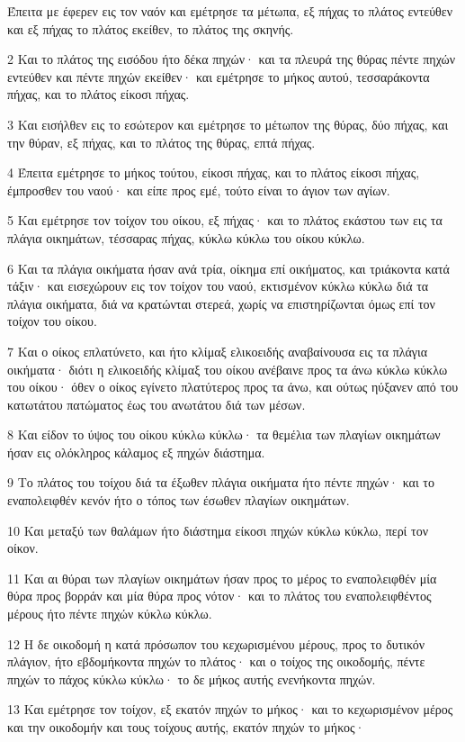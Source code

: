 \par Έπειτα με έφερεν εις τον ναόν και εμέτρησε τα μέτωπα, εξ πήχας το πλάτος εντεύθεν και εξ πήχας το πλάτος εκείθεν, το πλάτος της σκηνής.
\par 2 Και το πλάτος της εισόδου ήτο δέκα πηχών· και τα πλευρά της θύρας πέντε πηχών εντεύθεν και πέντε πηχών εκείθεν· και εμέτρησε το μήκος αυτού, τεσσαράκοντα πήχας, και το πλάτος είκοσι πήχας.
\par 3 Και εισήλθεν εις το εσώτερον και εμέτρησε το μέτωπον της θύρας, δύο πήχας, και την θύραν, εξ πήχας, και το πλάτος της θύρας, επτά πήχας.
\par 4 Έπειτα εμέτρησε το μήκος τούτου, είκοσι πήχας, και το πλάτος είκοσι πήχας, έμπροσθεν του ναού· και είπε προς εμέ, τούτο είναι το άγιον των αγίων.
\par 5 Και εμέτρησε τον τοίχον του οίκου, εξ πήχας· και το πλάτος εκάστου των εις τα πλάγια οικημάτων, τέσσαρας πήχας, κύκλω κύκλω του οίκου κύκλω.
\par 6 Και τα πλάγια οικήματα ήσαν ανά τρία, οίκημα επί οικήματος, και τριάκοντα κατά τάξιν· και εισεχώρουν εις τον τοίχον του ναού, εκτισμένον κύκλω κύκλω διά τα πλάγια οικήματα, διά να κρατώνται στερεά, χωρίς να επιστηρίζωνται όμως επί τον τοίχον του οίκου.
\par 7 Και ο οίκος επλατύνετο, και ήτο κλίμαξ ελικοειδής αναβαίνουσα εις τα πλάγια οικήματα· διότι η ελικοειδής κλίμαξ του οίκου ανέβαινε προς τα άνω κύκλω κύκλω του οίκου· όθεν ο οίκος εγίνετο πλατύτερος προς τα άνω, και ούτως ηύξανεν από του κατωτάτου πατώματος έως του ανωτάτου διά των μέσων.
\par 8 Και είδον το ύψος του οίκου κύκλω κύκλω· τα θεμέλια των πλαγίων οικημάτων ήσαν εις ολόκληρος κάλαμος εξ πηχών διάστημα.
\par 9 Το πλάτος του τοίχου διά τα έξωθεν πλάγια οικήματα ήτο πέντε πηχών· και το εναπολειφθέν κενόν ήτο ο τόπος των έσωθεν πλαγίων οικημάτων.
\par 10 Και μεταξύ των θαλάμων ήτο διάστημα είκοσι πηχών κύκλω κύκλω, περί τον οίκον.
\par 11 Και αι θύραι των πλαγίων οικημάτων ήσαν προς το μέρος το εναπολειφθέν μία θύρα προς βορράν και μία θύρα προς νότον· και το πλάτος του εναπολειφθέντος μέρους ήτο πέντε πηχών κύκλω κύκλω.
\par 12 Η δε οικοδομή η κατά πρόσωπον του κεχωρισμένου μέρους, προς το δυτικόν πλάγιον, ήτο εβδομήκοντα πηχών το πλάτος· και ο τοίχος της οικοδομής, πέντε πηχών το πάχος κύκλω κύκλω· το δε μήκος αυτής ενενήκοντα πηχών.
\par 13 Και εμέτρησε τον τοίχον, εξ εκατόν πηχών το μήκος· και το κεχωρισμένον μέρος και την οικοδομήν και τους τοίχους αυτής, εκατόν πηχών το μήκος·
